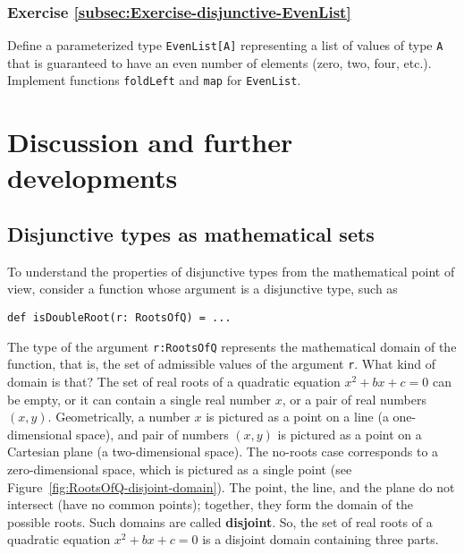\subsubsection{Exercise \label{subsec:Exercise-disjunctive-EvenList}\ref{subsec:Exercise-disjunctive-EvenList}}

Define a parameterized type \lstinline!EvenList[A]! representing
a list of values of type \lstinline!A! that is guaranteed to have
an even number of elements (zero, two, four, etc.). Implement functions
\lstinline!foldLeft! and \lstinline!map! for \lstinline!EvenList!.%
\begin{comment}
Solution:
\begin{lstlisting}
sealed trait EvenList[A]
final case class Lempty[A]() extends EvenList[A]
final case class Lpair[A](x: A, y: A, tail: EvenList[A]) extends EvenList

def fmap[A, B](f: A => B): EvenList[A] => EvenList[B] = {
case Lempty() => Lempty[B]()
case Lpair(x, y, tail) => Lpair[B](f(x), f(y), fmap(f)(tail))
}
\end{lstlisting}
\end{comment}


\section{Discussion and further developments}

\subsection{Disjunctive types as mathematical sets}

To understand the properties of disjunctive types from the mathematical
point of view, consider a function whose argument is a disjunctive
type, such as
\begin{lstlisting}
def isDoubleRoot(r: RootsOfQ) = ...
\end{lstlisting}
The type of the argument \lstinline!r:RootsOfQ! represents the mathematical
domain of the function, that is, the set of admissible values of the
argument \lstinline!r!. What kind of domain is that? The set of real
roots of a quadratic equation $x^{2}+bx+c=0$ can be empty, or it
can contain a single real number $x$, or a pair of real numbers $\left(x,y\right)$.
Geometrically, a number $x$ is pictured as a point on a line (a one-dimensional
space), and pair of numbers $\left(x,y\right)$ is pictured as a point
on a Cartesian plane (a two-dimensional space). The no-roots case
corresponds to a zero-dimensional space, which is pictured as a single
point (see Figure~\ref{fig:RootsOfQ-disjoint-domain}). The point,
the line, and the plane do not intersect (have no common points);
together, they form the domain of the possible roots. Such domains
are called \textbf{disjoint}. So, the set
of real roots of a quadratic equation $x^{2}+bx+c=0$ is a disjoint
domain containing three parts.

